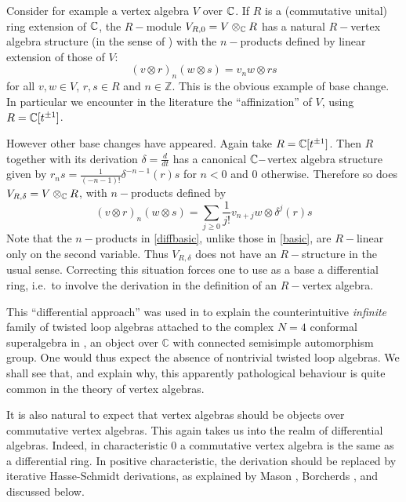 \documentclass{article}
\theoremstyle{definition}
\def\Z{\ensuremath{\mathbb Z}}
\begin{document}
Consider for example a vertex algebra $V$ over $\Bbb{C}$. If $R$ is a (commutative unital) ring extension of $\Bbb{C}$, the $R-$module $V_{R,0} =V\otimes_\Bbb{C} R$ has a natural $R-$vertex algebra structure (in the sense of \cite{Mason}) with the $n-$products defined by linear extension of those of $V$:
\begin{equation}(v\otimes r)_n (w\otimes s)=v_nw\otimes rs\label{basic}\end{equation}
for all $v,w\in V$, $r,s\in R$ and $n\in \Z$. This is the obvious example of base change. In particular we encounter in the literature the ``affinization'' of $V$, using $R=\Bbb{C}[t^{\pm1}]$.

However other base changes have appeared. Again take $R=\Bbb{C}[t^{\pm1}]$. Then $R$ together with its derivation $\delta=\frac{d}{dt}$ has a canonical $\Bbb{C}-$vertex algebra structure \cite{Bor} given by $r_ns=\frac{1}{(-n-1)!}\delta^{-n-1}(r)s$ for $n<0$ and 0 otherwise. Therefore so does $V_{R,\delta}=V\otimes_\Bbb{C} R$, with $n-$products defined by
\begin{equation}(v\otimes r)_n(w\otimes s)=\sum_{j\ge0}\frac{1}{j!}v_{n+j}w\otimes\delta^j(r)s\label{diffbasic}\end{equation}
Note that  the $n-$products in \eqref{diffbasic}, unlike those in \eqref{basic}, are $R-$linear only on the second variable. Thus $V_{R,\delta}$ does not have an $R-$structure in the usual sense. Correcting this situation forces one to use as a base  a differential ring, i.e.\ to involve the derivation in the definition of an $R-$vertex algebra. 

This ``differential approach'' was used in \cite{KLP} to explain the counterintuitive \emph{infinite} family of twisted loop algebras attached to the complex $N=4$ conformal superalgebra in \cite{SS}, an object over $\mathbb C$ with connected semisimple automorphism group. One would thus expect the absence of nontrivial twisted loop algebras. We shall see that, and explain why,  this apparently pathological behaviour is quite common in the theory of vertex algebras.

It is also natural to expect that vertex algebras should be objects over commutative vertex algebras. This again takes us into the realm of differential algebras.  Indeed, in characteristic 0 a commutative vertex algebra is the same as a differential ring. In positive characteristic, the derivation should be replaced by iterative Hasse-Schmidt derivations, as explained by Mason \cite{Mason}, Borcherds \cite{Bor}, and discussed below.
\end{document}
